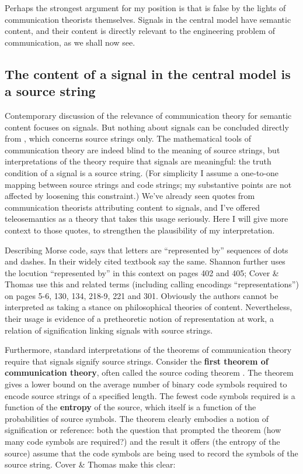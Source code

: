 \documentclass[12pt]{article}
\begin{document}
Perhaps the strongest argument for my position is that \tic{} is false by the lights of communication theorists themselves.
Signals in the central model have semantic content, and their content is directly relevant to the engineering problem of communication, as we shall now see.


\subsection{The content of a signal in the central model is a source string}\label{subsec:signalContent}

Contemporary discussion of the relevance of communication theory for semantic content focuses on signals.
But nothing about signals can be concluded directly from \sw{}, which concerns source strings only.
The mathematical tools of communication theory are indeed blind to the meaning of source strings, but interpretations of the theory require that signals are meaningful: the truth condition of a signal is a source string.
(For simplicity I assume a one-to-one mapping between source strings and code strings; my substantive points are not affected by loosening this constraint.)
We've already seen quotes from communication theorists attributing content to signals, and I've offered teleosemantics as a theory that takes this usage seriously.
Here I will give more context to those quotes, to strengthen the plausibility of my interpretation.

Describing Morse code, \citet[385]{shannon1948mathematicalc} says that letters are ``represented by'' sequences of dots and dashes.
In their widely cited textbook \citet[105]{cover2006elements} say the same.
Shannon further uses the locution ``represented by'' in this context on pages 402 and 405; Cover \& Thomas use this and related terms (including calling encodings ``representations'') on pages 5-6, 130, 134, 218-9, 221 and 301.
Obviously the authors cannot be interpreted as taking a stance on philosophical theories of content.
Nevertheless, their usage is evidence of a pretheoretic notion of representation at work, a relation of signification linking signals with source strings.

Furthermore, standard interpretations of the theorems of communication theory require that signals signify source strings.
Consider the \textbf{first theorem of communication theory}, often called the source coding theorem \citep[$\S$5]{cover2006elements} \citep[$\S$4]{mackay2003information}.
The theorem gives a lower bound on the average number of binary code symbols required to encode source strings of a specified length.
The fewest code symbols required is a function of the \textbf{entropy} of the source, which itself is a function of the probabilities of source symbols.
The theorem clearly embodies a notion of signification or reference: both the question that prompted the theorem (how many code symbols are required?) and the result it offers (the entropy of the source) assume that the code symbols are being used to record the symbols of the source string.
Cover \& Thomas make this clear:
\end{document}
